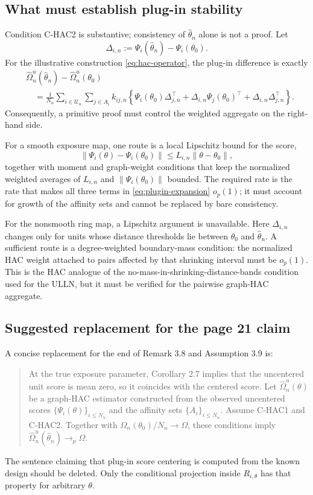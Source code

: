 \documentclass[11pt]{article}
\begin{document}
\subsection{What must establish plug-in stability}

Condition C-HAC2 is substantive; consistency of \(\widehat\theta_n\) alone is
not a proof. Let
\[
 \Delta_{i,n}:=\Psi_i(\widehat\theta_n)-\Psi_i(\theta_0).
\]
For the illustrative construction \eqref{eq:hac-operator}, the plug-in
difference is exactly
\begin{align}
 &\widehat\Omega_n^u(\widehat\theta_n)
   -\widehat\Omega_n^u(\theta_0) \\
 &\quad=\frac{1}{N_n}
   \sum_{i\in\mathcal U_n}\sum_{j\in A_i}k_{ij,n}
   \left\{
     \Psi_i(\theta_0)\Delta_{j,n}^\top
     +\Delta_{i,n}\Psi_j(\theta_0)^\top
     +\Delta_{i,n}\Delta_{j,n}^\top
   \right\}.
 \label{eq:plugin-expansion}
\end{align}
Consequently, a primitive proof must control the weighted aggregate on the
right-hand side.

For a smooth exposure map, one route is a local Lipschitz bound for the score,
\[
 \|\Psi_i(\theta)-\Psi_i(\theta_0)\|
 \le L_{i,n}\|\theta-\theta_0\|,
\]
together with moment and graph-weight conditions that keep the normalized
weighted averages of \(L_{i,n}\) and \(\|\Psi_i(\theta_0)\|\) bounded. The
required rate is the rate that makes all three terms in
\eqref{eq:plugin-expansion} \(o_p(1)\); it must account for growth of the
affinity sets and cannot be replaced by bare consistency.

For the nonsmooth ring map, a Lipschitz argument is unavailable. Here
\(\Delta_{i,n}\) changes only for units whose distance thresholds lie between
\(\theta_0\) and \(\widehat\theta_n\). A sufficient route is a
degree-weighted boundary-mass condition: the normalized HAC weight attached to
pairs affected by that shrinking interval must be \(o_p(1)\). This is the HAC
analogue of the no-mass-in-shrinking-distance-bands condition used for the
ULLN, but it must be verified for the pairwise graph-HAC aggregate.

\subsection{Suggested replacement for the page 21 claim}

A concise replacement for the end of Remark 3.8 and Assumption 3.9 is:
\begin{quote}
At the true exposure parameter, Corollary 2.7 implies that the uncentered unit
score is mean zero, so it coincides with the centered score. Let
\(\widehat\Omega_n^u(\theta)\) be a graph-HAC estimator constructed from the
observed uncentered scores \(\{\Psi_i(\theta)\}_{i\le N_n}\) and the affinity
sets \(\{A_i\}_{i\le N_n}\). Assume C-HAC1 and C-HAC2. Together with
\(\Omega_n(\theta_0)/N_n\to\Omega\), these conditions imply
\(\widehat\Omega_n^u(\widehat\theta_n)\to_p\Omega\).
\end{quote}
The sentence claiming that plug-in score centering is computed from the known
design should be deleted. Only the conditional projection inside
\(R_{i,\theta}\) has that property for arbitrary \(\theta\).
\end{document}

